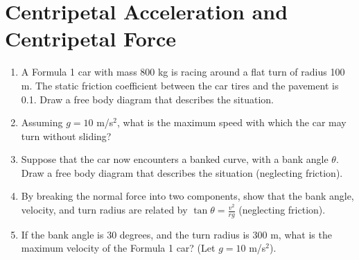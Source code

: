 \documentclass[10pt]{article}
\begin{document}
\section{Centripetal Acceleration and Centripetal Force}
\begin{enumerate}
\item A Formula 1 car with mass 800 kg is racing around a flat turn of radius 100 m.  The static friction coefficient between the car tires and the pavement is 0.1.  Draw a free body diagram that describes the situation. \\ \vspace{2cm}
\item Assuming $g = 10$ m/s$^2$, what is the maximum speed with which the car may turn without sliding? \\ \vspace{2cm} 
\item Suppose that the car now encounters a banked curve, with a bank angle $\theta$.  Draw a free body diagram that describes the situation (neglecting friction). \\ \vspace{2cm}
\item By breaking the normal force into two components, show that the bank angle, velocity, and turn radius are related by $\tan\theta = \frac{v^2}{rg}$ (neglecting friction). \\ \vspace{2cm}
\item If the bank angle is 30 degrees, and the turn radius is 300 m, what is the maximum velocity of the Formula 1 car?  (Let $g = 10$ m/s$^2$). \\ \vspace{2cm}
\end{enumerate}
\end{document}
